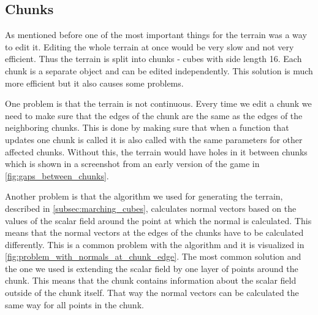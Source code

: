 \subsection{Chunks}
As mentioned before one of the most important things for the terrain was a way to edit it.
Editing the whole terrain at once would be very slow and not very efficient.
Thus the terrain is split into chunks - cubes with side length 16.
Each chunk is a separate object and can be edited independently.
This solution is much more efficient but it also causes some problems.

One problem is that the terrain is not continuous.
Every time we edit a chunk we need to make sure that the edges of the chunk are the same as the edges of the neighboring chunks.
This is done by making sure that when a function that updates one chunk is called it is also called with the same parameters for other affected chunks.
Without this, the terrain would have holes in it between chunks which is shown in a screenshot from an early version of the game in \autoref{fig:gaps_between_chunks}.

Another problem is that the algorithm we used for generating the terrain, described in \autoref{subsec:marching_cubes}, calculates normal vectors based on the values of the scalar field around the point at which the normal is calculated.
This means that the normal vectors at the edges of the chunks have to be calculated differently.
This is a common problem with the algorithm and it is visualized in \autoref{fig:problem_with_normals_at_chunk_edge}.
The most common solution and the one we used is extending the scalar field by one layer of points around the chunk.
This means that the chunk contains information about the scalar field outside of the chunk itself.
That way the normal vectors can be calculated the same way for all points in the chunk.

